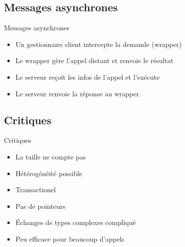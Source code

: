 \begin{frame}{\sectitle}
    \def\subsectitle{Messages asynchrones}
    \subsection{\subsectitle}
    \begin{block}{\subsectitle}
        \begin{itemize}
            \item Un gestionnaire client intercepte la demande (wrapper)
            \item Le wrapper gère l'appel distant et renvoie le résultat
            \item Le serveur reçoit les infos de l'appel et l'exécute
            \item Le serveur renvoie la réponse au wrapper.
        \end{itemize}
    \end{block}
    \def\subsectitle{Critiques}
    \subsection{\subsectitle}
    \begin{block}{\subsectitle}
        \begin{itemize}
            \item La taille ne compte pas
            \item Hétérogénéité possible
            \item Transactionel 
            \item Pas de pointeurs
            \item Échanges de types complexes compliqué
            \item Peu efficace pour beaucoup d'appels
        \end{itemize}
    \end{block}
\end{frame}

